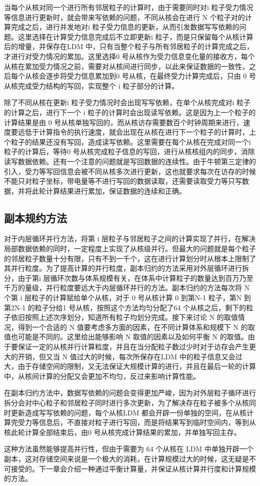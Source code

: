 当每个从核对同一个进行所有邻居粒子的计算时，由于需要同时对i 粒子受力情况等信息进行更新时，就会带来写依赖的问题，不同从核会在进行 N 个粒子对的计算完成之后，进行并发地对i 粒子受力信息的更新，从而引发数据写写依赖的问题。这里选择在计算受力信息完成后不立即更新i 粒子，而是只保留每个从核计算后的增量，并保存在LDM 中，只有当整个粒子与所有邻居粒子的计算完成之后，才进行对受力情况的累加。这里选择0 号从核作为受力信息变化量的接收方，每个从核在累加受力情况之前，需要对从核间进行同步，以此来保证数据的一致性，之后每个从核会逐步将受力信息累加到0 号从核，在最终受力计算完成后，只由 0 号从核完成受力结构的写回，实现整个 i 粒子部分的计算。

除了不同从核在更新i 粒子受力情况时会出现写写依赖，在单个从核完成对i 粒子的计算之后，进行下一个 i 粒子的计算时会出现读写依赖。这是因为上一个粒子的计算结果是由 0 号从核单独写回的，而从核访存需要数百个时钟周期来进行，速度要远低于计算指令的执行速度，就会出现在从核在进行下一个粒子的计算时，上个粒子的结果还没有写回，造成读写依赖。这里需要在每个从核在完成对同一个i 粒子的计算后，等待0 号从核完成粒子信息的写回，进行从核核组内的同步，消除读写数据依赖。还有一个注意的问题就是写回数据的连续性。由于牛顿第三定律的引入，受力等写回信息会被不同从核多次进行更新，这也就要求每次在访存的时候不能只对粒子坐标，带电量等不进行写回的数据读取，还需要读取受力等只写数据，并将此轮计算结果进行累加，保证数据的连续和正确。

\subsection{副本规约方法}
对于内层循环并行方法，将第 i 层粒子与邻居粒子之间的计算实现了并行，在解决局部数据依赖的同时，一定程度上实现了从核级并行。但最大的问题就是每个粒子的邻居粒子数量十分有限，只有不到一千个，这在进行计算划分时从根本上限制了其并行粒度。为了提高计算的并行粒度，副本归约的方法采用对外层循环进行拆分，由于第i 层循环次数与体系规模有关，在体系中计算粒子的数量达到百万乃至千万的量级，并行粒度要远大于内层循环并行的方法。副本归约的方法每次将 N 个第 i 层粒子的计算赋给单个从核，对于 0 号从核计算 0 到第N-1 粒子，第N 到第2N-1 的粒子分给1 号从核，按照这个方法均匀分配了64 个从核之后，剩下的粒子依旧按照上述次序划分，知道所有粒子均划分完成。接下来讨论 N 的取值情况，得到一个合适的 N 值要考虑多方面的因素，在不同计算体系和规模下 N 的取值也可能是不同的。这里给出能够影响 N 取值的因素以及如何平衡 N 的取值。由于要保证一定的从核并行计算粒度，并且在当分配粒子数过少时对于访存会产生更大的开销，但又当 N 值过大的时候，每次所保存在LDM 中的粒子信息又会过大，由于存储空间的限制，又无法保证大规模计算的进行，并且在最后一轮的计算中，从核间计算的分配又会更加不均匀，反过来影响计算性能。

在副本归约方法中，数据写依赖的问题会变得更加严峻，因为对外层粒子循环进行拆分会对中心粒子和邻居粒子同时进行多次更新，为了解决存在粒子被多个从核同时更新造成写写依赖的问题，每个从核LDM 都会开辟一份单独的空间，在从核计算完受力等信息后，不直接对粒子进行写回，而是将结果写到临时空间内，等到从核此轮计算全部结束后，由0 号从核完成计算结果的累加，并单独写回主存。

这种方法虽然能够提高并行性，但由于需要为 64 个从核在 LDM 中单独开辟一个副本，这对存储空间来说是一个极大的消耗，在计算规模过大的时候，这无疑是不可接受的。下一章会介绍一种通过平衡计算量，并保证从核计算并行度和计算规模的方法。
